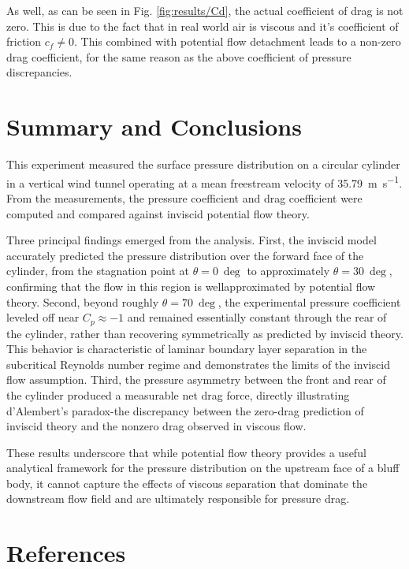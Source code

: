 As well, as can be seen in Fig. \ref{fig:results/Cd}, the actual coefficient of drag is not zero. This is due to the fact that in real world air is viscous and it's coefficient of friction \(c_f \neq 0\). This combined with potential flow detachment leads to a non-zero drag coefficient, for the same reason as the above coefficient of pressure discrepancies.

\section{Summary and Conclusions} \label{sec:summary}

This experiment measured the surface pressure distribution on a circular cylinder in a vertical wind tunnel operating at a mean freestream velocity of \qty{35.79}{\m\per\s}. From the measurements, the pressure coefficient and drag coefficient were computed and compared against inviscid potential flow theory.

Three principal findings emerged from the analysis. First, the inviscid model accurately predicted the pressure distribution over the forward face of the cylinder, from the stagnation point at \(\theta=\qty{0}{\deg}\) to approximately \(\theta=\qty{30}{\deg}\), confirming that the flow in this region is wellapproximated by potential flow theory. Second, beyond roughly \(\theta=\qty{70}{\deg}\), the experimental pressure coefficient leveled off near \(C_p \approx-1\) and remained essentially constant through the rear of the cylinder, rather than recovering symmetrically as predicted by inviscid theory. This behavior is characteristic of laminar boundary layer separation in the subcritical Reynolds number regime and demonstrates the limits of the inviscid flow assumption. Third, the pressure asymmetry between the front and rear of the cylinder produced a measurable net drag force, directly illustrating d'Alembert's paradox-the discrepancy between the zero-drag prediction of inviscid theory and the nonzero drag observed in viscous flow.

These results underscore that while potential flow theory provides a useful analytical framework for the pressure distribution on the upstream face of a bluff body, it cannot capture the effects of viscous separation that dominate the downstream flow field and are ultimately responsible for pressure drag.

\section{References} \label{sec:references}

